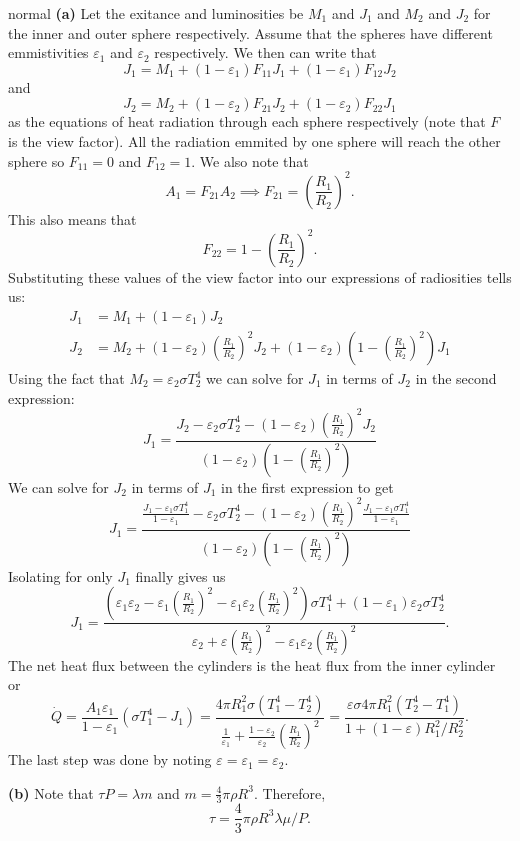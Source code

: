 \begin{solution}{normal}
\textbf{(a)} Let the exitance and luminosities be $M_1$ and $J_1$ and $M_2$ and $J_2$ for the inner and outer sphere respectively. Assume that the spheres have different emmistivities $\varepsilon_1$ and $\varepsilon_2$ respectively. We then can write that 
\[J_1 = M_1 + (1 - \varepsilon_1)F_{11} J_1 + (1 - \varepsilon_1)F_{12}J_2\]
and 
\[J_2 = M_2 + (1 - \varepsilon_2) F_{21} J_2 + (1 - \varepsilon_2)F_{22}J_1\]
as the equations of heat radiation through each sphere respectively (note that $F$ is the view factor). All the radiation emmited by one sphere will reach the other sphere so $F_{11} = 0$ and $F_{12} = 1$. We also note that 
\[A_1 = F_{21} A_2 \implies F_{21} = \left(\frac{R_1}{R_2}\right)^2.\]
This also means that 
\[F_{22} = 1 -  \left(\frac{R_1}{R_2}\right)^2.\]
Substituting these values of the view factor into our expressions of radiosities tells us:
\begin{align*}
J_1 &= M_1  + (1 - \varepsilon_1)J_2 \\ 
J_2 &= M_2 + (1 - \varepsilon_2) \left(\frac{R_1}{R_2}\right)^2 J_2 + (1 - \varepsilon_2)\left(1 -  \left(\frac{R_1}{R_2}\right)^2\right)J_1
\end{align*}
Using the fact that $M_2 = \varepsilon_2 \sigma T_2^4$ we can solve for $J_1$ in terms of $J_2$ in the second expression:
\[J_1 = \frac{J_2 - \varepsilon_2 \sigma T_2^4 - (1 - \varepsilon_2) \left(\frac{R_1}{R_2}\right)^2 J_2}{(1 - \varepsilon_2)\left(1 -  \left(\frac{R_1}{R_2}\right)^2\right)}\]
We can solve for $J_2$ in terms of $J_1$ in the first expression to get 
\[J_1 = \frac{\frac{J_1 - \varepsilon_1 \sigma T_1^4}{1 - \varepsilon_1} - \varepsilon_2 \sigma T_2^4 - (1 - \varepsilon_2) \left(\frac{R_1}{R_2}\right)^2 \frac{J_1 - \varepsilon_1 \sigma T_1^4}{1 - \varepsilon_1}}{(1 - \varepsilon_2)\left(1 -  \left(\frac{R_1}{R_2}\right)^2\right)}\]
Isolating for only $J_1$ finally gives us 
\[J_1 = \frac{\left(\varepsilon_1\varepsilon_2 - \varepsilon_1 \left(\frac{R_1}{R_2}\right)^2 - \varepsilon_1 \varepsilon_2 \left(\frac{R_1}{R_2}\right)^2\right)\sigma T_1^4 + (1 - \varepsilon_1)\varepsilon_2 \sigma T_2^4}{\varepsilon_2 + \varepsilon\left(\frac{R_1}{R_2}\right)^2 - \varepsilon_1 \varepsilon_2 \left(\frac{R_1}{R_2}\right)^2}.\]
The net heat flux between the cylinders is the heat flux from the inner cylinder or
\[\dot{Q} = \frac{A_1\varepsilon_1}{1 - \varepsilon_1} (\sigma T_1^4 - J_1) = \frac{4\pi R_1^2 \sigma (T_1^4 - T_2^4)}{\frac{1}{\varepsilon_1} + \frac{1 - \varepsilon_2}{\varepsilon_2} \left(\frac{R_1}{R_2}\right)^2} = \frac{\varepsilon \sigma 4\pi R_1^2 (T_2^4 - T_1^4)}{1 + (1 - \varepsilon)R_1^2/R_2^2}.\]
The last step was done by noting $\varepsilon = \varepsilon_1 = \varepsilon_2$.
\vspace{3mm}

\noindent \textbf{(b)} Note that $\tau P = \lambda m$ and $m = \frac{4}{3}\pi\rho R^3$. Therefore, 
\[\tau = \frac{4}{3}\pi \rho R^3\lambda\mu/P.\]
\end{solution}